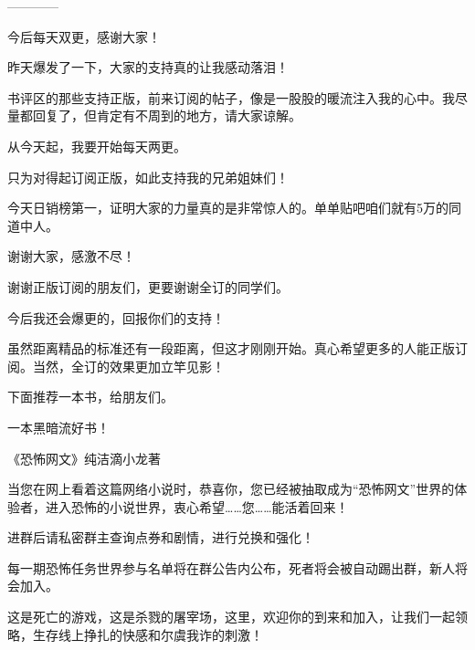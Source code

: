 \begin{this_body}
------------

今后每天双更，感谢大家！

昨天爆发了一下，大家的支持真的让我感动落泪！

书评区的那些支持正版，前来订阅的帖子，像是一股股的暖流注入我的心中。我尽量都回复了，但肯定有不周到的地方，请大家谅解。

从今天起，我要开始每天两更。

只为对得起订阅正版，如此支持我的兄弟姐妹们！

今天日销榜第一，证明大家的力量真的是非常惊人的。单单贴吧咱们就有5万的同道中人。

谢谢大家，感激不尽！

谢谢正版订阅的朋友们，更要谢谢全订的同学们。

今后我还会爆更的，回报你们的支持！

虽然距离精品的标准还有一段距离，但这才刚刚开始。真心希望更多的人能正版订阅。当然，全订的效果更加立竿见影！

下面推荐一本书，给朋友们。

一本黑暗流好书！

《恐怖网文》纯洁滴小龙著

当您在网上看着这篇网络小说时，恭喜你，您已经被抽取成为“恐怖网文”世界的体验者，进入恐怖的小说世界，衷心希望……您……能活着回来！

进群后请私密群主查询点券和剧情，进行兑换和强化！

每一期恐怖任务世界参与名单将在群公告内公布，死者将会被自动踢出群，新人将会加入。

这是死亡的游戏，这是杀戮的屠宰场，这里，欢迎你的到来和加入，让我们一起领略，生存线上挣扎的快感和尔虞我诈的刺激！

\end{this_body}

